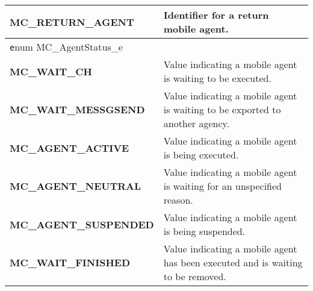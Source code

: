 \begin{table}[!h]
\begin{center}
\begin{tabular}{p{50 mm}p{110 mm}}
{\bf MC\_RETURN\_AGENT} \index{MC\_RETURN\_AGENT} & Identifier for a return mobile agent. \\
\hline
{\texttt enum MC\_AgentStatus\_e} \index{MC\_AgentStatus\_e} & \\
\hline
{\bf MC\_WAIT\_CH} \index{MC\_WAIT\_CH} & Value indicating a mobile agent is waiting to be executed. \\
{\bf MC\_WAIT\_MESSGSEND} \index{MC\_WAIT\_MESSGSEND}& Value indicating a mobile agent is waiting to be exported to another agency. \\
{\bf MC\_AGENT\_ACTIVE} \index{MC\_AGENT\_ACTIVE}& Value indicating a mobile agent is being executed. \\
{\bf MC\_AGENT\_NEUTRAL} \index{MC\_AGENT\_NEUTRAL}& Value indicating a mobile agent is waiting for an unspecified reason. \\
{\bf MC\_AGENT\_SUSPENDED} \index{MC\_AGENT\_SUSPENDED}& Value indicating a mobile agent is being suspended. \\
{\bf MC\_WAIT\_FINISHED} \index{MC\_WAIT\_FINISHED}& Value indicating a mobile agent has been executed and is waiting to be removed. \\
\hline
\end{tabular}
\end{center}
\label{mobilec_macro}
\end{table}

